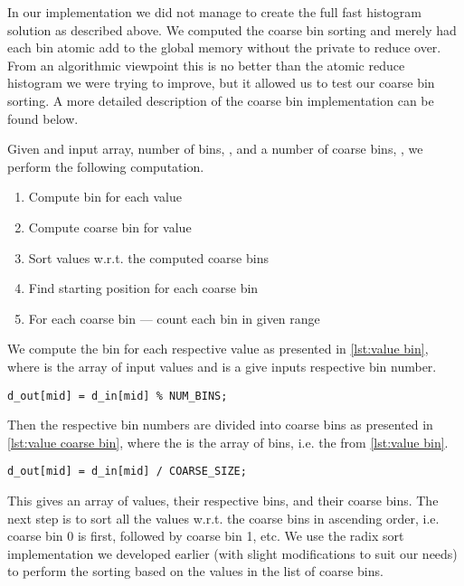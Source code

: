 In our implementation we did not manage to create the full fast histogram solution as described above.
We computed the coarse bin sorting and merely had each bin atomic add to the global memory without the private  to reduce over.
From an algorithmic viewpoint this is no better than the atomic reduce histogram we were trying to improve, but it allowed us to test our coarse bin sorting.
A more detailed description of the coarse bin implementation can be found below.

Given and input array, number of bins, , and a number of coarse bins, , we perform the following computation.
%
\begin{enumerate}
  \item Compute bin for each value
  \item Compute coarse bin for value
  \item Sort values w.r.t. the computed coarse bins
  \item Find starting position for each coarse bin
  \item For each coarse bin --- count each bin in given range
\end{enumerate}
%
We compute the bin for each respective value as presented in \cref{lst:value bin}, where  is the array of input values and  is a give inputs respective bin number.

\begin{lstlisting}[caption={compute each value's bin}, label={lst:value bin}, numbers=none]
d_out[mid] = d_in[mid] % NUM_BINS;
\end{lstlisting}

Then the respective bin numbers are divided into coarse bins as presented in \cref{lst:value coarse bin}, where the  is the array of bins, i.e. the  from \cref{lst:value bin}.

\begin{lstlisting}[caption={compute each value's coarse bin}, label={lst:value coarse bin}, numbers=none]
d_out[mid] = d_in[mid] / COARSE_SIZE;
\end{lstlisting}

This gives an array of values, their respective bins, and their coarse bins.
The next step is to sort all the values w.r.t. the coarse bins in ascending order, i.e. coarse bin 0 is first, followed by coarse bin 1, etc.
We use the radix sort implementation we developed earlier (with slight modifications to suit our needs) to perform the sorting based on the values in the list of coarse bins.

